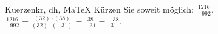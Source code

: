 \begin{MAufgabe}{Kuerzen}{kr, dh, MaTeX}
K\"urzen Sie soweit m\"oglich: $\frac{1216}{-992}$.\\ 
\ifLsg\MLoesung
\quad $\frac{1216}{-992}=\frac{(32)\cdot(38)}{(32)\cdot(-31)}=\frac{38}{-31}=\frac{-38}{31}$.\else\relax\fi
 \end{MAufgabe}